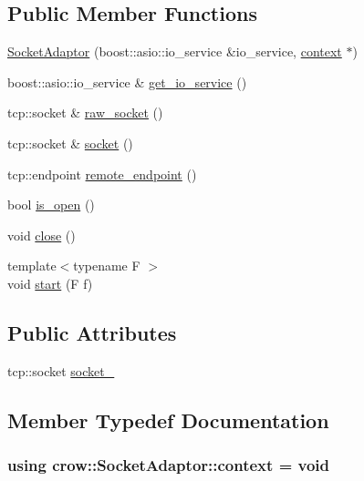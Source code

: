 \subsection*{Public Member Functions}
\begin{DoxyCompactItemize}
\item 
\hyperlink{structcrow_1_1_socket_adaptor_ae86b04665391cb1fb36ec15e49787348}{Socket\-Adaptor} (boost\-::asio\-::io\-\_\-service \&io\-\_\-service, \hyperlink{structcrow_1_1_socket_adaptor_aca8c861d9a672785e17e127042d2f721}{context} $\ast$)
\item 
boost\-::asio\-::io\-\_\-service \& \hyperlink{structcrow_1_1_socket_adaptor_a0510de3c3c993cfd8a36950b69a6700e}{get\-\_\-io\-\_\-service} ()
\item 
tcp\-::socket \& \hyperlink{structcrow_1_1_socket_adaptor_a6c1efabfc9bf922308027f3d35c1f2c7}{raw\-\_\-socket} ()
\item 
tcp\-::socket \& \hyperlink{structcrow_1_1_socket_adaptor_a70c413ce6d8f9e2fe1e4852fc07f0928}{socket} ()
\item 
tcp\-::endpoint \hyperlink{structcrow_1_1_socket_adaptor_a23fb23ae334da14488199fe04d5ea066}{remote\-\_\-endpoint} ()
\item 
bool \hyperlink{structcrow_1_1_socket_adaptor_a2630c4db0c3065e7c7b396515571941a}{is\-\_\-open} ()
\item 
void \hyperlink{structcrow_1_1_socket_adaptor_af925b4f600663b2293741947297d730e}{close} ()
\item 
{\footnotesize template$<$typename F $>$ }\\void \hyperlink{structcrow_1_1_socket_adaptor_a074e679e5abd86af6bcd3f505accfb4e}{start} (F f)
\end{DoxyCompactItemize}
\subsection*{Public Attributes}
\begin{DoxyCompactItemize}
\item 
tcp\-::socket \hyperlink{structcrow_1_1_socket_adaptor_adfae304955845303cee26c31910b1f2c}{socket\-\_\-}
\end{DoxyCompactItemize}


\subsection{Member Typedef Documentation}
\hypertarget{structcrow_1_1_socket_adaptor_aca8c861d9a672785e17e127042d2f721}{
\subsubsection[{context}]{\setlength{\rightskip}{0pt plus 5cm}using {\bf crow\-::\-Socket\-Adaptor\-::context} =  void}}\label{structcrow_1_1_socket_adaptor_aca8c861d9a672785e17e127042d2f721}


